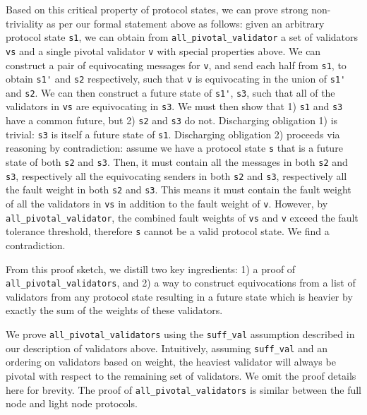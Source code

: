 \documentclass[runningheads]{llncs}
\begin{document}
Based on this critical property of protocol states, we can prove strong non-triviality as per our formal statement above as follows: given an arbitrary protocol state \verb|s1|, we can obtain from \verb|all_pivotal_validator| a set of validators \verb|vs| and a single pivotal validator \verb|v| with special properties above. We can construct a pair of equivocating messages for \verb|v|, and send each half from \verb|s1|, to obtain \verb|s1'| and \verb|s2| respectively, such that \verb|v| is equivocating in the union of \verb|s1'| and \verb|s2|. We can then construct a future state of \verb|s1'|, \verb|s3|, such that all of the validators in \verb|vs| are equivocating in \verb|s3|. We must then show that 1) \verb|s1| and \verb|s3| have a common future, but 2) \verb|s2| and \verb|s3| do not. Discharging obligation 1) is trivial: \verb|s3| is itself a future state of \verb|s1|. Discharging obligation 2) proceeds via reasoning by contradiction: assume we have a protocol state \verb|s| that is a future state of both \verb|s2| and \verb|s3|. Then, it must contain all the messages in both \verb|s2| and \verb|s3|, respectively all the equivocating senders in both \verb|s2| and \verb|s3|, respectively all the fault weight in both \verb|s2| and \verb|s3|. This means it must contain the fault weight of all the validators in \verb|vs| in addition to the fault weight of \verb|v|. However, by \verb|all_pivotal_validator|, the combined fault weights of \verb|vs| and \verb|v| exceed the fault tolerance threshold, therefore \verb|s| cannot be a valid protocol state. We find a contradiction. 

From this proof sketch, we distill two key ingredients: 1) a proof of \\ \verb|all_pivotal_validators|, and 2) a way to construct equivocations from a list of validators from any protocol state resulting in a future state which is heavier by exactly the sum of the weights of these validators. 

We prove \verb|all_pivotal_validators| using the \verb|suff_val| assumption described in our description of validators above. Intuitively, assuming \verb|suff_val| and an ordering on validators based on weight, the heaviest validator will always be pivotal with respect to the remaining set of validators. We omit the proof details here for brevity. The proof of \verb|all_pivotal_validators| is similar between the full node and light node protocols. 
\end{document}
